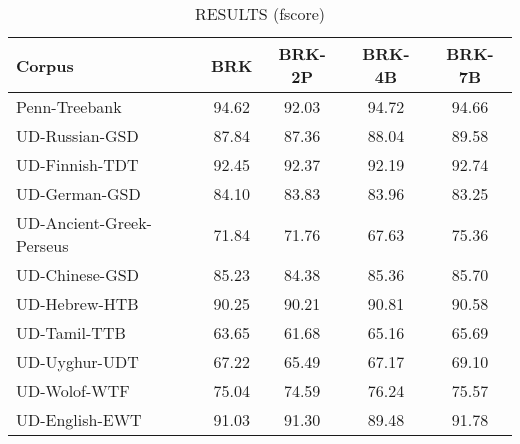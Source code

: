 

        \begin{table}[h]
            \centering
            \caption{RESULTS (fscore)}
            \label{tab:scores}
            
            \begin{tabular}{lcccc}
                \hline
                \textbf{Corpus}                & \textbf{BRK} & \textbf{BRK-2P} & \textbf{BRK-4B} & \textbf{BRK-7B} \\ 
                \hline
                Penn-Treebank                  & 94.62        & 92.03           & 94.72           & 94.66           \\
                UD-Russian-GSD                 & 87.84        & 87.36           & 88.04           & 89.58           \\
                UD-Finnish-TDT                 & 92.45        & 92.37           & 92.19           & 92.74           \\
                UD-German-GSD                  & 84.10        & 83.83           & 83.96           & 83.25           \\
                UD-Ancient-Greek-Perseus       & 71.84        & 71.76           & 67.63           & 75.36           \\
                UD-Chinese-GSD                 & 85.23        & 84.38           & 85.36           & 85.70           \\
                UD-Hebrew-HTB                  & 90.25        & 90.21           & 90.81           & 90.58           \\  
                UD-Tamil-TTB                   & 63.65        & 61.68           & 65.16           & 65.69           \\
                UD-Uyghur-UDT                  & 67.22        & 65.49           & 67.17           & 69.10           \\
                UD-Wolof-WTF                   & 75.04        & 74.59           & 76.24           & 75.57           \\
                UD-English-EWT                 & 91.03        & 91.30           & 89.48           & 91.78           \\
                \hline

            \end{tabular}
        \end{table}

